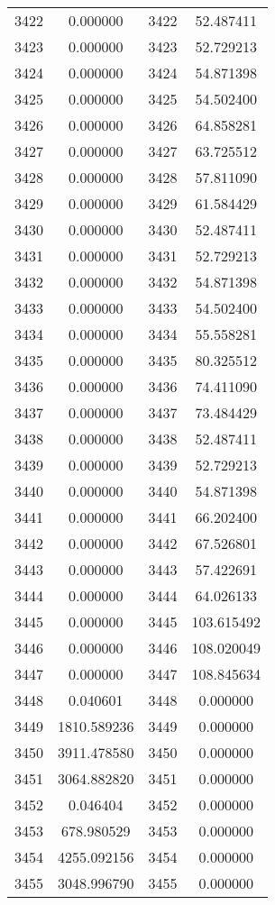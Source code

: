 \documentclass[12pt]{article}
\begin{document}
\begin{longtable}{@{}cccc@{}}
3422 & 0.000000 & 3422 & 52.487411 \\
3423 & 0.000000 & 3423 & 52.729213 \\
3424 & 0.000000 & 3424 & 54.871398 \\
3425 & 0.000000 & 3425 & 54.502400 \\
3426 & 0.000000 & 3426 & 64.858281 \\
3427 & 0.000000 & 3427 & 63.725512 \\
3428 & 0.000000 & 3428 & 57.811090 \\
3429 & 0.000000 & 3429 & 61.584429 \\
3430 & 0.000000 & 3430 & 52.487411 \\
3431 & 0.000000 & 3431 & 52.729213 \\
3432 & 0.000000 & 3432 & 54.871398 \\
3433 & 0.000000 & 3433 & 54.502400 \\
3434 & 0.000000 & 3434 & 55.558281 \\
3435 & 0.000000 & 3435 & 80.325512 \\
3436 & 0.000000 & 3436 & 74.411090 \\
3437 & 0.000000 & 3437 & 73.484429 \\
3438 & 0.000000 & 3438 & 52.487411 \\
3439 & 0.000000 & 3439 & 52.729213 \\
3440 & 0.000000 & 3440 & 54.871398 \\
3441 & 0.000000 & 3441 & 66.202400 \\
3442 & 0.000000 & 3442 & 67.526801 \\
3443 & 0.000000 & 3443 & 57.422691 \\
3444 & 0.000000 & 3444 & 64.026133 \\
3445 & 0.000000 & 3445 & 103.615492 \\
3446 & 0.000000 & 3446 & 108.020049 \\
3447 & 0.000000 & 3447 & 108.845634 \\
3448 & 0.040601 & 3448 & 0.000000 \\
3449 & 1810.589236 & 3449 & 0.000000 \\
3450 & 3911.478580 & 3450 & 0.000000 \\
3451 & 3064.882820 & 3451 & 0.000000 \\
3452 & 0.046404 & 3452 & 0.000000 \\
3453 & 678.980529 & 3453 & 0.000000 \\
3454 & 4255.092156 & 3454 & 0.000000 \\
3455 & 3048.996790 & 3455 & 0.000000 \\

\end{longtable}
\end{document}
